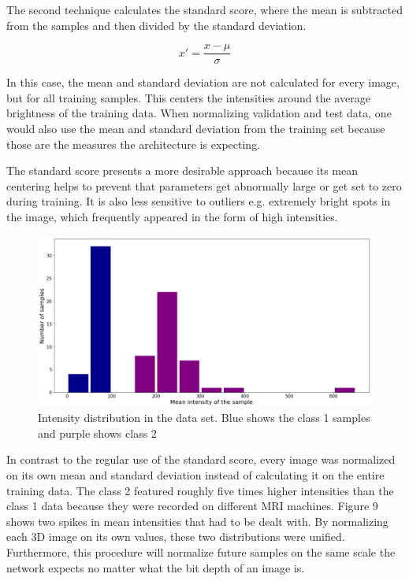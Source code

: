 The second technique calculates the standard score, where the mean is subtracted from the samples and then divided by the standard deviation.

\begin{figure}[H]
\[x' = \frac {x - \mu}{\sigma}\]
\end{figure}

In this case, the mean and standard deviation are not calculated for every image, but for all training samples. This centers the intensities around the average brightness of the training data. When normalizing validation and test data, one would also use the mean and standard deviation from the training set because those are the measures the architecture is expecting.

The standard score presents a more desirable approach because its mean centering helps to prevent that parameters get abnormally large or get set to zero during training. It is also less sensitive to outliers e.g. extremely bright spots in the image, which frequently appeared in the form of high intensities.

\begin{figure}[H]
\centering
\par
\includegraphics[width=1.0\textwidth]{imgs/intensity_distr.png}
\caption{Intensity distribution in the data set. Blue shows the class 1 samples and purple shows class 2}
\par
\end{figure}

In contrast to the regular use of the standard score, every image was normalized on its own mean and standard deviation instead of calculating it on the entire training data. The class 2 featured roughly five times higher intensities than the class 1 data because they were recorded on different MRI machines. Figure 9 shows two spikes in mean intensities that had to be dealt with. By normalizing each 3D image on its own values, these two distributions were unified. Furthermore, this procedure will normalize future samples on the same scale the network expects no matter what the bit depth of an image is.

